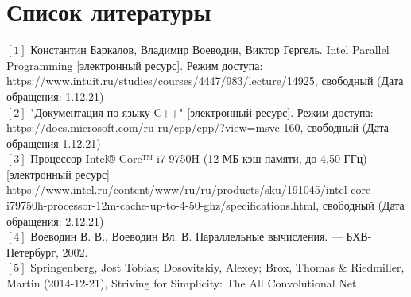 %
\chapter{Список литературы}
\noindent$[1]$  Константин Баркалов, Владимир Воеводин, Виктор Гергель. Intel Parallel Programming [электронный ресурс]. Режим доступа: https://www.intuit.ru/studies/courses/4447/983/lecture/14925, свободный (Дата обращения: 1.12.21)\\
$[2]$ "Документация по языку C++" [электронный ресурс]. Режим доступа: https://docs.microsoft.com/ru-ru/cpp/cpp/?view=msvc-160, свободный (Дата обращения 1.12.21)\\
$[3]$ Процессор Intel® Core™ i7-9750H (12 МБ кэш-памяти, до 4,50 ГГц) [электронный ресурс] https://www.intel.ru/content/www/ru/ru/products/sku/191045/intel-core-i79750h-processor-12m-cache-up-to-4-50-ghz/specifications.html, свободный (Дата обращения: 2.12.21)\\
$[4]$ Воеводин В. В., Воеводин Вл. В. Параллельные вычисления. — БХВ-Петербург, 2002. \\
$[5]$ Springenberg, Jost Tobias; Dosovitskiy, Alexey; Brox, Thomas \& Riedmiller, Martin (2014-12-21), Striving for Simplicity: The All Convolutional Net\\